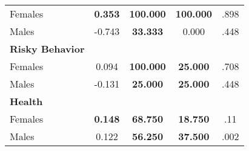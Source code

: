 \begin{tabular}{l c c c c}
\quad Females &  \textbf{    0.353} & \textbf{  100.000} & \textbf{  100.000} & .898 \\
\quad Males &     -0.743 & \textbf{   33.333} &     0.000 & .448 \\
\midrule
\textbf{Risky Behavior} & & & & \\
\quad Females &      0.094 & \textbf{  100.000} & \textbf{   25.000} & .708 \\
\quad Males &     -0.131 & \textbf{   25.000} & \textbf{   25.000} & .448 \\
\midrule
\textbf{Health} & & & & \\
\quad Females &  \textbf{    0.148} & \textbf{   68.750} & \textbf{   18.750} & .11 \\
\quad Males &      0.122 & \textbf{   56.250} & \textbf{   37.500} & .002 \\
\bottomrule
\end{tabular}
